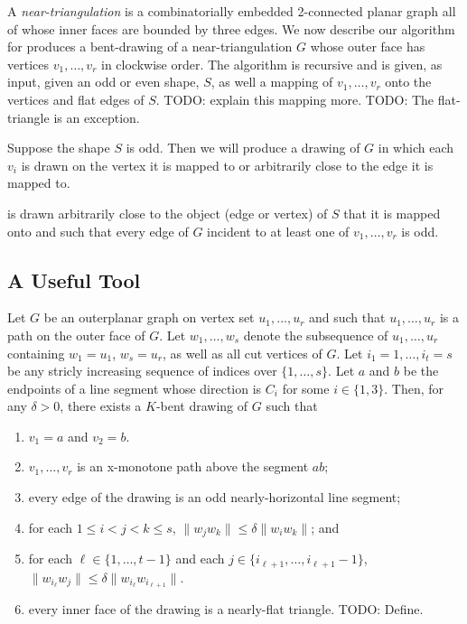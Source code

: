 \documentclass{patmorin}
\begin{document}
A \emph{near-triangulation} is a combinatorially embedded 2-connected planar
graph all of whose inner faces are bounded by three edges.
We now describe our algorithm for produces a bent-drawing of a
near-triangulation $G$ whose outer face has vertices $v_1,\ldots,v_r$
in clockwise order.  The algorithm is recursive and is given, as input,
given an odd or even shape, $S$, as well a mapping of
$v_1,\ldots,v_r$ onto the vertices and flat edges of $S$.
TODO: explain this mapping more. TODO: The flat-triangle is an exception.

Suppose the shape $S$ is odd.  Then we will produce a drawing of $G$
in which each $v_i$ is drawn on the vertex it is mapped to or arbitrarily close to the edge it is mapped to.


 is drawn arbitrarily close to the object (edge or
vertex) of $S$ that it is mapped onto and such that every edge of $G$
incident to at least one of $v_1,\ldots,v_r$ is odd.


\subsection{A Useful Tool}

\begin{lem}
   Let $G$ be an outerplanar graph on vertex set $u_1,\ldots,u_r$ and such that $u_1,\ldots,u_r$ is a path on the outer face of $G$.  Let $w_1,\ldots,w_s$ denote the subsequence of $u_1,\ldots,u_r$ containing $w_1=u_1$, $w_s=u_r$, as well as all cut vertices of $G$.  Let $i_1=1,\dots,i_t=s$ be any stricly increasing sequence of indices over $\{1,\ldots,s\}$. Let $a$ and $b$ be the endpoints of a line segment whose direction is $C_i$ for some $i\in\{1,3\}$.  
   Then, for any $\delta>0$,
   there exists a $K$-bent drawing of $G$ such that 
\begin{enumerate}
   \item $v_1=a$ and $v_2=b$.
   \item $v_1,\ldots,v_r$ is an x-monotone path above the segment $ab$; 
   \item every edge of the drawing is an odd nearly-horizontal line segment;
   \item for each $1\le i<j<k\le s$, $\|w_jw_k\|\le \delta\|w_{i}w_k\|$; and
   \item for each $\ell\in\{1,\ldots,t-1\}$ and each $j\in\{i_{\ell+1},\ldots,i_{\ell+1}-1\}$,
     $\|w_{i_\ell}w_j\| \le \delta\|w_{i_\ell}w_{i_{\ell+1}}\|$.
   \item every inner face of the drawing is a nearly-flat triangle. TODO: Define.
\end{enumerate}
\end{lem}
\end{document}
